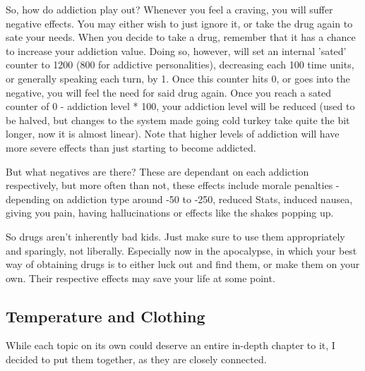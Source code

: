 \documentclass[11pt]{report}
\begin{document}
So, how do addiction play out? Whenever you feel a craving, you will suffer negative effects. You may either wish to just ignore it, or take the drug again to sate your needs. When you decide to take a drug, remember that it has a chance to increase your addiction value. Doing so, however, will set an internal 'sated' counter to 1200 (800 for addictive personalities), decreasing each 100 time units, or generally speaking each turn, by 1. Once this counter hits 0, or goes into the negative, you will feel the need for said drug again.
Once you reach a sated counter of 0 - addiction level * 100, your addiction level will be reduced (used to be halved, but changes to the system made going cold turkey take quite the bit longer, now it is almost linear). Note that higher levels of addiction will have more severe effects than just starting to become addicted.

But what negatives are there? These are dependant on each addiction respectively, but more often than not, these effects include morale penalties - depending on addiction type around -50 to -250, reduced Stats, induced nausea, giving you pain, having hallucinations or effects like the shakes popping up.

So drugs aren't inherently bad kids. Just make sure to use them appropriately and sparingly, not liberally. Especially now in the apocalypse, in which your best way of obtaining drugs is to either luck out and find them, or make them on your own. Their respective effects may save your life at some point.

\subsection{Temperature and Clothing}

While each topic on its own could deserve an entire in-depth chapter to it, I decided to put them together, as they are closely connected.
\end{document}
